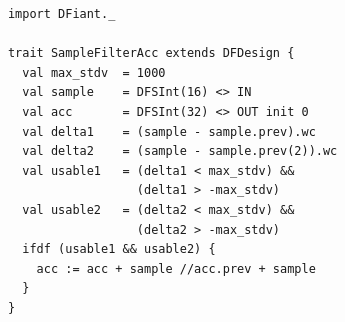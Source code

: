 \begin{table}[t!]
  \centering
  \begin{minipage}[t][6.8cm][t]{0.46\linewidth}
    \centering
    \begin{verbatim}
      import DFiant._
      
      trait SampleFilterAcc extends DFDesign {
        val max_stdv  = 1000
        val sample    = DFSInt(16) <> IN
        val acc       = DFSInt(32) <> OUT init 0
        val delta1    = (sample - sample.prev).wc
        val delta2    = (sample - sample.prev(2)).wc
        val usable1   = (delta1 < max_stdv) && 
                        (delta1 > -max_stdv)
        val usable2   = (delta2 < max_stdv) && 
                        (delta2 > -max_stdv)
        ifdf (usable1 && usable2) {
          acc := acc + sample //acc.prev + sample
        }
      }    
      

\end{verbatim}
\end{minipage}
\end{table}
